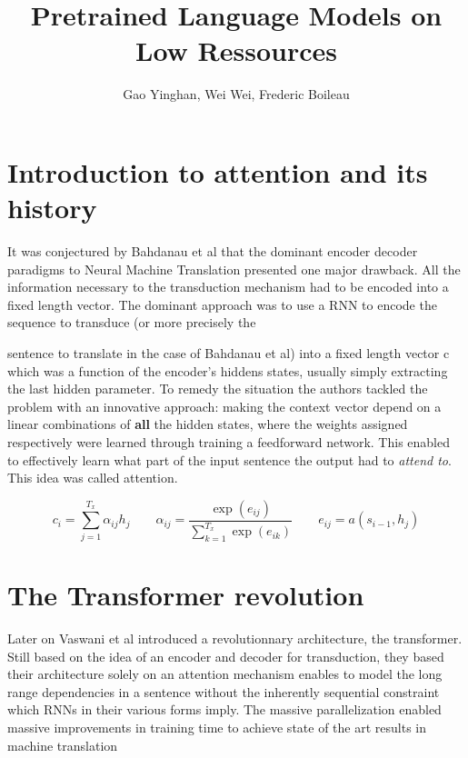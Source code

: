 \documentclass{article}
\title{\textbf{Pretrained Language Models on Low Ressources}}
\author{Gao Yinghan, Wei Wei, Frederic Boileau}
\begin{document}
\maketitle
\thispagestyle{plain}


\section*{Introduction to attention and its history}

It was conjectured by Bahdanau et al\cite{bahdanau2016neural} that the
dominant encoder decoder paradigms to Neural Machine Translation presented one
major drawback. All the information necessary to the transduction mechanism had
to be encoded into a fixed length vector. The dominant approach was to use a RNN
to encode the sequence to transduce (or more precisely the



sentence to translate
in the case of Bahdanau et al) into a fixed length vector c which was a function
of the encoder's hiddens states, usually simply extracting the last hidden
parameter. To remedy the situation the authors tackled the problem with an
innovative approach: making the context vector depend on a linear combinations
of \textbf{all} the hidden states, where the weights assigned respectively were
learned through training a feedforward network. This enabled to effectively
learn what part of the input sentence the output had to \textit{attend to}. This
idea was called attention.

\begin{equation}
  \label{eq:3}
  c_{i} = \sum_{j=1}^{T_{x}}\alpha_{ij}h_{j} \qquad
  \alpha_{ij} = \frac{\exp(e_{ij})}{\sum_{k=1}^{T_{x}}\exp(e_{ik})} \qquad
  e_{ij} = a(s_{i-1}, h_{j})
\end{equation}


\section*{The Transformer revolution}
Later on Vaswani et al \cite{allyouneed} introduced a revolutionnary
architecture, the transformer. Still based on the idea of an encoder and decoder
for transduction, they based their architecture solely on an attention mechanism
enables to model the long range dependencies in a sentence without the
inherently sequential constraint which RNNs in their various forms imply. The
massive parallelization enabled massive improvements in training time to achieve
state of the art results in machine translation\\
\end{document}
